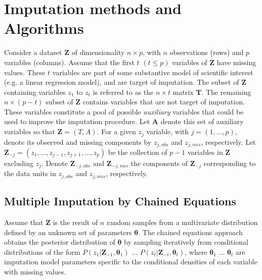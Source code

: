 \section{Imputation methods and Algorithms} \label{secMethods}

Consider a dataset $\bm{Z}$ of dimensionality $n \times p$, with $n$ observations (rows) and 
$p$ variables (columns).
Assume that the first $t$ $(t \leq p)$ variables of $\bm{Z}$ have missing values.
These $t$ variables are part of some substantive model of scientific interest (e.g. a linear 
regression model), and are target of imputation.
The subset of $\bm{Z}$ containing variables $z_1$ to $z_t$ is referred to as the $n \times t$ matrix $\bm{T}$.
The remaining $n \times (p-t)$ subset of $\bm{Z}$ contains variables that are not target of imputation.
These variables constitute a pool of possible \emph{auxiliary} variables that could be used to improve 
the imputation procedure.
Let $\bm{A}$ denote this set of auxiliary variables so that $\bm{Z} = (T, A)$.
For a given $z_j$ variable, with $j = (1, ..., p)$, denote its observed and missing components 
by $z_{j, obs}$ and $z_{j, mis}$, respectively.
Let $\bm{Z}_{-j} = (z_1, ..., z_{j-1}, z_{j+1}, ..., z_{p})$ be the collection of $p-1$ variables in 
$\bm{Z}$ excluding $z_j$.
Denote $\bm{Z}_{-j, obs}$ and $\bm{Z}_{-j, mis}$ the components of $\bm{Z}_{-j}$ corresponding to the
data units in $z_{j, obs}$ and $z_{j, mis}$, respectively.

\subsection{Multiple Imputation by Chained Equations}

Assume that $\bm{Z}$ is the result of $n$ random samples from a multivariate distribution defined by 
an unknown set of parameters $\bm{\theta}$.
The chained equations approach obtains the posterior distribution of $\bm{\theta}$ by sampling iteratively 
from conditional distributions of the form $P(z_{1}|\bm{Z}_{-1}, \bm{\theta}_{1})$ $...$ 
$P(z_{t}|\bm{Z}_{-t}, \bm{\theta}_{t})$, where $\bm{\theta}_{1}$ $...$ $\bm{\theta}_{t}$ are imputation model 
parameters specific to the conditional densities of each variable with missing values.

